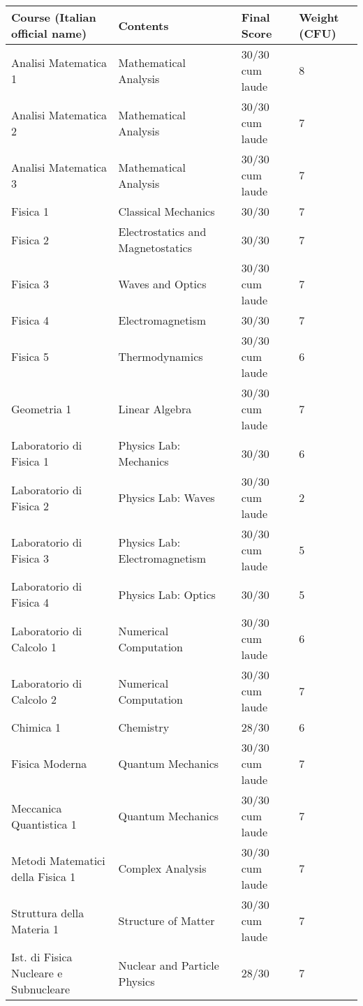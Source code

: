 \documentclass[a4paper,10pt,notitlepage]{paper}
\begin{document}
{\centering \footnotesize
\begin{tabular*}{\linewidth}{lll@{\hspace{0.7cm}}l@{\extracolsep{\fill}}}
\bf Course (Italian official name) & \bf Contents  & \bf Final Score &\bf Weight (CFU) \\
\hline \hline
Analisi Matematica 1  					&  Mathematical Analysis	& 30/30 cum laude &8\\	
Analisi Matematica 2  					&  Mathematical Analysis	&  30/30 cum laude &7\\	
Analisi Matematica 3  					&  Mathematical Analysis	& 30/30 cum laude &7\\	
Fisica 1  								&  Classical Mechanics& 30/30 &7\\	
Fisica 2  								&  Electrostatics and Magnetostatics &   30/30   &7\\
Fisica 3  								&  Waves and Optics&   30/30 cum laude &7\\		
Fisica 4  								&  Electromagnetism  & 30/30  &7\\	
Fisica 5  								&  Thermodynamics &    30/30 cum laude&6\\	
Geometria	 1							&  Linear Algebra &    30/30 cum laude &7\\		
Laboratorio di Fisica 1					&  Physics Lab: Mechanics &  30/30 &6\\
Laboratorio di Fisica 2					&  Physics Lab: Waves&  30/30   cum laude &2\\	
Laboratorio di Fisica 3					&  Physics Lab: Electromagnetism&   30/30 cum laude  &5\\
Laboratorio di Fisica 4					&  Physics Lab: Optics&   30/30 &5\\	
Laboratorio di Calcolo 1					&  Numerical Computation&    30/30  cum laude &6\\	
Laboratorio di Calcolo 2					&  Numerical Computation&     30/30 cum laude &7\\	
Chimica 1								&  Chemistry &     28/30 &6\\	
Fisica Moderna 						&  Quantum Mechanics&  30/30  cum laude &7\\	
Meccanica Quantistica 1					&  Quantum Mechanics&   30/30  cum laude &7\\
Metodi Matematici della Fisica 1			&  Complex Analysis &   30/30 cum laude &7\\
Struttura della Materia 1					&  Structure of Matter&  30/30 cum laude  &7\\
Ist. di Fisica Nucleare e Subnucleare			&  Nuclear and Particle Physics& 28/30 &7\\	

\end{tabular*}}
\end{document}
